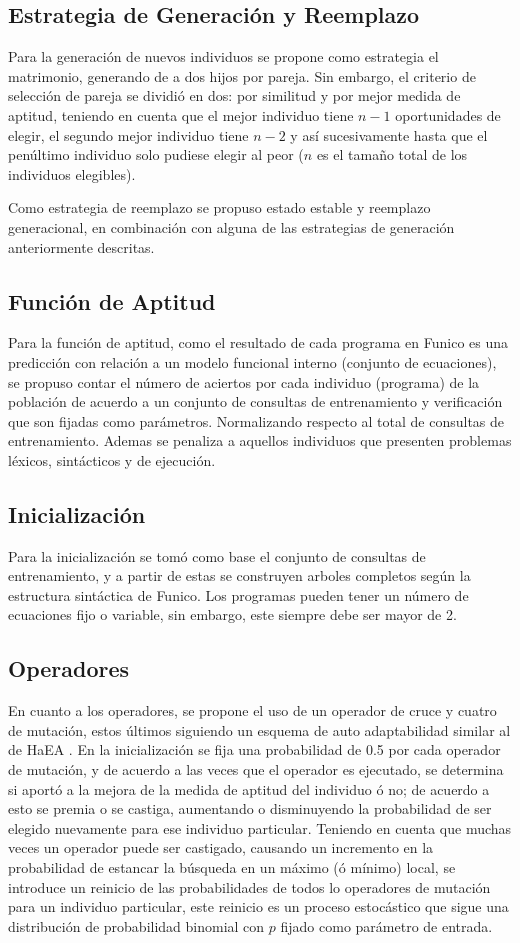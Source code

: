 \documentclass{llncs}
\begin{document}
\subsection{Estrategia de Generación y Reemplazo}
Para la generación de nuevos individuos se propone como estrategia el matrimonio, generando de a dos hijos por pareja. Sin embargo, el criterio de selección de pareja se dividió en dos: por similitud y por mejor medida de aptitud, teniendo en cuenta que el mejor individuo tiene $n-1$ oportunidades de elegir, el segundo mejor individuo tiene $n-2$ y así sucesivamente hasta que el penúltimo individuo solo pudiese elegir al peor ($n$ es el tamaño total de los individuos elegibles).

Como estrategia de reemplazo se propuso estado estable y reemplazo generacional, en combinación con alguna de las estrategias de generación anteriormente descritas.

\subsection{Función de Aptitud}
Para la función de aptitud, como el resultado de cada programa en Funico es una predicción con relación a un modelo funcional interno (conjunto de ecuaciones), se propuso contar el número de aciertos por cada individuo (programa) de la población de acuerdo a un conjunto de consultas de entrenamiento y verificación que son fijadas como parámetros. Normalizando respecto al total de consultas de entrenamiento. Ademas se penaliza a aquellos individuos que presenten problemas léxicos, sintácticos y de ejecución.
\subsection{Inicialización}
Para la inicialización se tomó como base el conjunto de consultas de entrenamiento, y a partir de estas se construyen arboles completos según la estructura sintáctica de Funico. Los programas pueden tener un número de ecuaciones fijo o variable, sin embargo, este siempre debe ser mayor de 2.

\subsection{Operadores}
En cuanto a los operadores, se propone el uso de un operador de cruce y cuatro de mutación, estos últimos siguiendo un esquema de auto adaptabilidad similar al de HaEA \cite{gomez}. En la inicialización se fija una probabilidad de 0.5 por cada operador de mutación, y de acuerdo a las veces que el operador es ejecutado, se determina si aportó a la mejora de la medida de aptitud del individuo ó no; de acuerdo a esto se premia o se castiga, aumentando o disminuyendo la probabilidad de ser elegido nuevamente para ese individuo particular. Teniendo en cuenta que muchas veces un operador puede ser castigado, causando un incremento en la probabilidad de estancar la búsqueda en un máximo (ó mínimo) local, se introduce un reinicio de las probabilidades de todos lo operadores de mutación para un individuo particular, este reinicio es un proceso estocástico que sigue una distribución de probabilidad binomial con $p$ fijado como parámetro de entrada.
\end{document}
